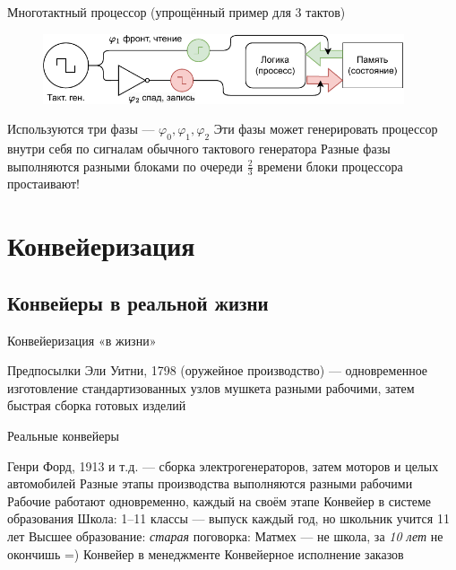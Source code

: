 \documentclass[xetex,aspectratio=43]{beamer}
\begin{document}
\begin{frame}{Многотактный процессор (упрощённый пример для 3 тактов)}
    \vspace{-2mm}
    \begin{figure}
        \includegraphics[width=0.95\textwidth, page=3]{img/11.CPUS.drawio-crop.pdf}
    \end{figure}
    \vspace{-2mm}

    \begin{outline}[itemize]
        \1 Используются три фазы --- $\varphi_0, \varphi_1, \varphi_2$
            \2 Эти фазы может генерировать процессор внутри себя по сигналам обычного тактового генератора
        \1 Разные фазы выполняются разными блоками по очереди
            \2 $\frac{2}{3}$ времени блоки процессора простаивают!
    \end{outline}
\end{frame}

\section{Конвейеризация}

\subsection{Конвейеры в реальной жизни}

\begin{frame}{Конвейеризация «в жизни»}
\begin{block}{Предпосылки}
    Эли Уитни, 1798 (оружейное производство) — одновременное изготовление стандартизованных узлов мушкета разными рабочими, затем быстрая сборка готовых изделий
\end{block}

\begin{block}{Реальные конвейеры}
    \begin{outline}[itemize]
        \1 Генри Форд, 1913 и т.д. — сборка электрогенераторов, затем моторов и целых автомобилей
            \2 Разные этапы производства выполняются разными рабочими
            \2 Рабочие работают одновременно, каждый на своём этапе
        \1 Конвейер в системе образования
            \2 Школа: 1–11 классы — выпуск каждый год, но школьник учится 11 лет
            \2 Высшее образование: \emph{старая} поговорка: Матмех — не школа, за \emph{10 лет} не окончишь =)
        \1 Конвейер в менеджменте
            \2 Конвейерное исполнение заказов
    \end{outline}
\end{block}
\end{frame}
\end{document}
